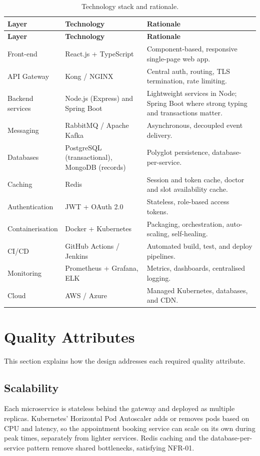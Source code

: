 \documentclass[12pt,a4paper]{article}
\begin{document}
\begin{longtable}{p{3.6cm} p{4.6cm} p{5.4cm}}
\caption{Technology stack and rationale.}\\
\toprule
\textbf{Layer} & \textbf{Technology} & \textbf{Rationale}\\
\midrule
\endfirsthead
\toprule
\textbf{Layer} & \textbf{Technology} & \textbf{Rationale}\\
\midrule
\endhead
Front-end & React.js + TypeScript & Component-based, responsive single-page web app.\\
API Gateway & Kong / NGINX & Central auth, routing, TLS termination, rate limiting.\\
Backend services & Node.js (Express) and Spring Boot & Lightweight services in Node; Spring
Boot where strong typing and transactions matter.\\
Messaging & RabbitMQ / Apache Kafka & Asynchronous, decoupled event delivery.\\
Databases & PostgreSQL (transactional), MongoDB (records) & Polyglot persistence,
database-per-service.\\
Caching & Redis & Session and token cache, doctor and slot availability cache.\\
Authentication & JWT + OAuth 2.0 & Stateless, role-based access tokens.\\
Containerisation & Docker + Kubernetes & Packaging, orchestration, auto-scaling, self-healing.\\
CI/CD & GitHub Actions / Jenkins & Automated build, test, and deploy pipelines.\\
Monitoring & Prometheus + Grafana, ELK & Metrics, dashboards, centralised logging.\\
Cloud & AWS / Azure & Managed Kubernetes, databases, and CDN.\\
\bottomrule
\end{longtable}

\section{Quality Attributes}
This section explains how the design addresses each required quality attribute.

\subsection{Scalability}
Each microservice is stateless behind the gateway and deployed as multiple replicas.
Kubernetes' Horizontal Pod Autoscaler adds or removes pods based on CPU and latency, so the
appointment booking service can scale on its own during peak times, separately from lighter
services. Redis caching and the database-per-service pattern remove shared bottlenecks,
satisfying NFR-01.
\end{document}

